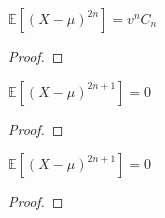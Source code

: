 \begin{lemma}
  \label{lem:centralMoment_fun_two_mul_semicircleReal}
  \leanok
   $\mathbb{E}[(X  - \mu)^{2n}] = v^n C_n $
   \begin{proof}
   \end{proof}
\end{lemma}


\begin{lemma}
  \label{lem:centralMoment_odd_semicircleReal}
  \leanok
  $\mathbb{E}[(X  - \mu)^{2n + 1}] = 0 $
  \begin{proof}
   \end{proof}
\end{lemma}


\begin{lemma}
  \label{lem:centralMoment_fun_odd_semicircleReal}
  \leanok
   $\mathbb{E}[(X  - \mu)^{2n + 1}] = 0 $
   \begin{proof}
   \end{proof}
\end{lemma}




